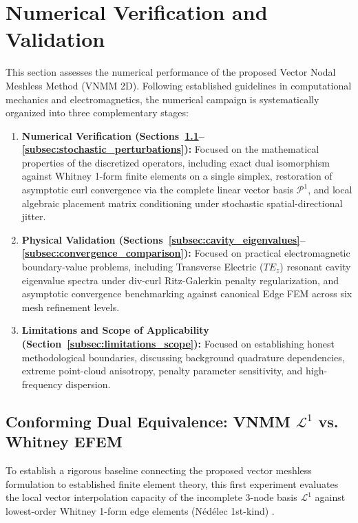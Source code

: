 \documentclass[preprint,12pt]{elsarticle}
\begin{document}
\section{Numerical Verification and Validation}
\label{sec:numerical_results}

This section assesses the numerical performance of the proposed Vector Nodal Meshless Method (VNMM 2D). Following established guidelines in computational mechanics and electromagnetics, the numerical campaign is systematically organized into three complementary stages:
\begin{enumerate}
    \item \textbf{Numerical Verification (Sections~\ref{subsec:conforming_dual_equivalence}--\ref{subsec:stochastic_perturbations}):} Focused on the mathematical properties of the discretized operators, including exact dual isomorphism against Whitney 1-form finite elements on a single simplex, restoration of asymptotic curl convergence via the complete linear vector basis $\mathcal{P}^1$, and local algebraic placement matrix conditioning under stochastic spatial-directional jitter.
    \item \textbf{Physical Validation (Sections~\ref{subsec:cavity_eigenvalues}--\ref{subsec:convergence_comparison}):} Focused on practical electromagnetic boundary-value problems, including Transverse Electric ($TE_z$) resonant cavity eigenvalue spectra under div-curl Ritz-Galerkin penalty regularization, and asymptotic convergence benchmarking against canonical Edge FEM across six mesh refinement levels.
    \item \textbf{Limitations and Scope of Applicability (Section~\ref{subsec:limitations_scope}):} Focused on establishing honest methodological boundaries, discussing background quadrature dependencies, extreme point-cloud anisotropy, penalty parameter sensitivity, and high-frequency dispersion.
\end{enumerate}

\subsection{Conforming Dual Equivalence: VNMM $\mathcal{L}^1$ vs. Whitney EFEM}
\label{subsec:conforming_dual_equivalence}

To establish a rigorous baseline connecting the proposed vector meshless formulation to established finite element theory, this first experiment evaluates the local vector interpolation capacity of the incomplete 3-node basis $\mathcal{L}^1$ against lowest-order Whitney 1-form edge elements (N\'ed\'elec 1st-kind) \cite{nedelec1980mixed, monk2003finite}.
\end{document}
